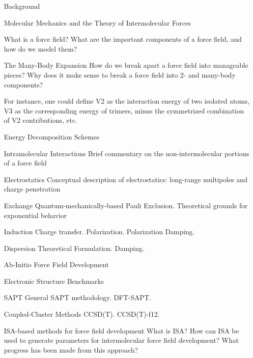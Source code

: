 \begin{chapter}{Background}
\label{ch:introduction}



\begin{section}{Molecular Mechanics and the Theory of Intermolecular Forces}

What is a force field?
What are the important components of a force field, and how do we model them?
%
\begin{subsection}{The Many-Body Expansion}
How do we break apart a force field into manageable pieces? Why does it make
sense to break a force field into 2- and many-body components?

For instance, one could define V2 as the interaction energy of two isolated
atoms, V3 as the corresponding energy of trimers, minus the symmetrized
combination of V2 contributions, etc.

\end{subsection}
\begin{subsection}{Energy Decomposition Schemes}
\begin{subsubsection}{Intramolecular Interactions}
Brief commentary on the non-intermolecular portions of a force field
\end{subsubsection}
\begin{subsubsection}{Electrostatics}
Conceptual description of electrostatics: long-range multipoles and charge
penetration
\end{subsubsection}
\begin{subsubsection}{Exchange}
Quantum-mechanically-based Pauli Exclusion.
Theoretical grounds for exponential behavior
\end{subsubsection}
\begin{subsubsection}{Induction}
Charge transfer.
Polarization.
Polarization Damping.
\end{subsubsection}
\begin{subsubsection}{Dispersion}
Theoretical Formulation.
Damping.
\end{subsubsection}
\end{subsection}
%
\end{section}


\begin{section}{Ab-Initio Force Field Development}
\begin{subsection}{Electronic Structure Benchmarks}
\begin{subsubsection}{SAPT}
General SAPT methodology.
DFT-SAPT.
\end{subsubsection}
\begin{subsubsection}{Coupled-Cluster Methods}
CCSD(T).
CCSD(T)-f12.
\end{subsubsection}
\end{subsection}
\end{section}


\begin{section}{ISA-based methods for force field development}
What is ISA? How can ISA be used to generate parameters for intermolecular
force field development? What progress has been made from this approach?
\end{section}



\end{chapter}
